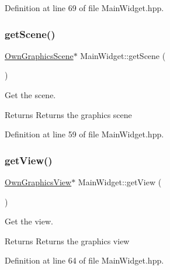Definition at line 69 of file Main\+Widget.\+hpp.

\mbox{\label{classMainWidget_ad40a8bd13b501a0ebe88c87426a5b591}} 
\subsubsection{\texorpdfstring{get\+Scene()}{getScene()}}
{\footnotesize\ttfamily \mbox{\hyperlink{classOwnGraphicsScene}{Own\+Graphics\+Scene}}$\ast$ Main\+Widget\+::get\+Scene (\begin{DoxyParamCaption}{ }\end{DoxyParamCaption})\hspace{0.3cm}{\ttfamily [inline]}}



Get the scene. 

\begin{DoxyReturn}{Returns}
Returns the graphics scene 
\end{DoxyReturn}


Definition at line 59 of file Main\+Widget.\+hpp.

\mbox{\label{classMainWidget_ad23c8b31116d474ce1a19fe78ad6db07}} 
\subsubsection{\texorpdfstring{get\+View()}{getView()}}
{\footnotesize\ttfamily \mbox{\hyperlink{classOwnGraphicsView}{Own\+Graphics\+View}}$\ast$ Main\+Widget\+::get\+View (\begin{DoxyParamCaption}{ }\end{DoxyParamCaption})\hspace{0.3cm}{\ttfamily [inline]}}



Get the view. 

\begin{DoxyReturn}{Returns}
Returns the graphics view 
\end{DoxyReturn}


Definition at line 64 of file Main\+Widget.\+hpp.

\mbox{\label{classMainWidget_af544f3b04a81d63c0810a90706773d3d}} 
